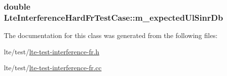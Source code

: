 \subsubsection[{\texorpdfstring{m\+\_\+expected\+Ul\+Sinr\+Db}{m_expectedUlSinrDb}}]{\setlength{\rightskip}{0pt plus 5cm}double Lte\+Interference\+Hard\+Fr\+Test\+Case\+::m\+\_\+expected\+Ul\+Sinr\+Db\hspace{0.3cm}{\ttfamily [private]}}\hypertarget{classLteInterferenceHardFrTestCase_abf4dcef5568774271ffde6575eda141e}{}\label{classLteInterferenceHardFrTestCase_abf4dcef5568774271ffde6575eda141e}


The documentation for this class was generated from the following files\+:\begin{DoxyCompactItemize}
\item 
lte/test/\hyperlink{lte-test-interference-fr_8h}{lte-\/test-\/interference-\/fr.\+h}\item 
lte/test/\hyperlink{lte-test-interference-fr_8cc}{lte-\/test-\/interference-\/fr.\+cc}\end{DoxyCompactItemize}
